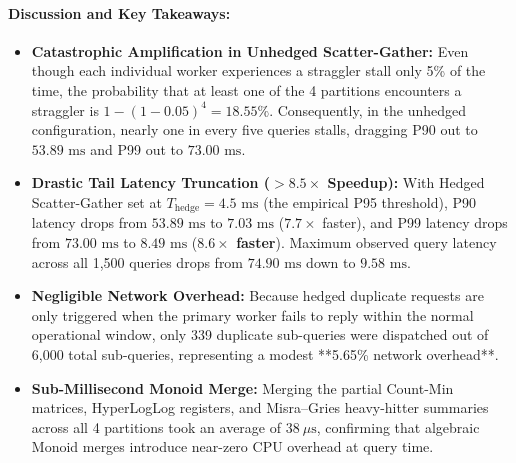 \paragraph{Discussion and Key Takeaways:}
\begin{itemize}
    \item \textbf{Catastrophic Amplification in Unhedged Scatter-Gather:} Even though each individual worker experiences a straggler stall only 5\% of the time, the probability that at least one of the 4 partitions encounters a straggler is $1 - (1 - 0.05)^4 = 18.55\%$. Consequently, in the unhedged configuration, nearly one in every five queries stalls, dragging P90 out to $53.89\text{ ms}$ and P99 out to $73.00\text{ ms}$.
    \item \textbf{Drastic Tail Latency Truncation ($>8.5\times$ Speedup):} With Hedged Scatter-Gather set at $T_{\text{hedge}} = 4.5\text{ ms}$ (the empirical P95 threshold), P90 latency drops from $53.89\text{ ms}$ to $7.03\text{ ms}$ ($7.7\times$ faster), and P99 latency drops from $73.00\text{ ms}$ to $8.49\text{ ms}$ (\textbf{$8.6\times$ faster}). Maximum observed query latency across all 1,500 queries drops from $74.90\text{ ms}$ down to $9.58\text{ ms}$.
    \item \textbf{Negligible Network Overhead:} Because hedged duplicate requests are only triggered when the primary worker fails to reply within the normal operational window, only 339 duplicate sub-queries were dispatched out of 6,000 total sub-queries, representing a modest **5.65\% network overhead**.
    \item \textbf{Sub-Millisecond Monoid Merge:} Merging the partial Count-Min matrices, HyperLogLog registers, and Misra--Gries heavy-hitter summaries across all 4 partitions took an average of $38\ \mu\text{s}$, confirming that algebraic Monoid merges introduce near-zero CPU overhead at query time.
\end{itemize}
